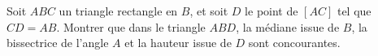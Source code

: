 Soit $ABC$ un triangle rectangle en $B$, et soit $D$ le point de $[AC]$ tel que $CD = AB$. Montrer que dans le triangle $ABD$, la médiane issue de $B$, la bissectrice de l'angle $A$ et la hauteur issue de $D$ sont concourantes.
